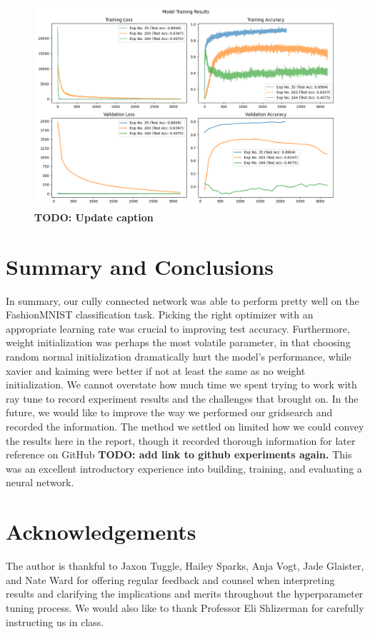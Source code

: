 \documentclass[10pt]{amsart}
\begin{document}
\begin{figure}[h]
	\centering
	\includegraphics[width=.9\textwidth]{../visualizations/model_training_results_vis_2.png}
 	\caption{\textbf{TODO: Update caption}}\label{fig:f4}
\end{figure}


\section{Summary and Conclusions}\label{sec:conclusions} 
In summary, our cully connected network was able to perform pretty well on the FashionMNIST classification task.
Picking the right optimizer with an appropriate learning rate was crucial to improving test accuracy.
Furthermore, weight initialization was perhaps the most volatile parameter, in that choosing random normal initialization dramatically hurt the model's performance, while xavier and kaiming were better if not at least the same as no weight initialization.
We cannot overstate how much time we spent trying to work with ray tune to record experiment results and the challenges that brought on.
In the future, we would like to improve the way we performed our gridsearch and recorded the information.
The method we settled on limited how we could convey the results here in the report, though it recorded thorough information for later reference on GitHub \textbf{TODO: add link to github experiments again.}
This was an excellent introductory experience into building, training, and evaluating a neural network.

\section*{Acknowledgements}
The author is thankful to Jaxon Tuggle, Hailey Sparks, Anja Vogt, Jade Glaister, and Nate Ward for offering regular feedback and counsel when interpreting results and clarifying the implications and merits throughout the hyperparameter tuning process.
We would also like to thank Professor Eli Shlizerman for carefully instructing us in class.


\end{document}
